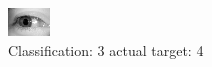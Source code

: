 \begin{figure}[h!]
\begin{center}
\includegraphics[width=0.60\columnwidth]{figures/ID3223_class_3_target_4.png}
\end{center}
\caption{ Classification: 3 actual target: 4}
\label{fig:ID3223_class_3_target_4}
\end{figure}
